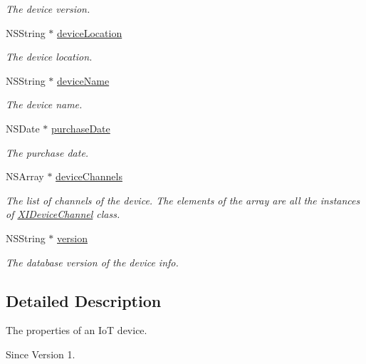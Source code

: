 \begin{DoxyCompactItemize}
\begin{DoxyCompactList}\small\item\em The device version. \end{DoxyCompactList}\item 
N\+S\+String $\ast$ \hyperlink{class_x_i_device_info_a2aa49cfc179f19162a62298f91938ce6}{device\+Location}
\begin{DoxyCompactList}\small\item\em The device location. \end{DoxyCompactList}\item 
N\+S\+String $\ast$ \hyperlink{class_x_i_device_info_ab578d2cea864531a027a611cb30982c1}{device\+Name}
\begin{DoxyCompactList}\small\item\em The device name. \end{DoxyCompactList}\item 
N\+S\+Date $\ast$ \hyperlink{class_x_i_device_info_a764ddcb5a675766b6114c56debe13ac8}{purchase\+Date}
\begin{DoxyCompactList}\small\item\em The purchase date. \end{DoxyCompactList}\item 
N\+S\+Array $\ast$ \hyperlink{class_x_i_device_info_a618f25a4cfac3972fb86c59ada06c662}{device\+Channels}
\begin{DoxyCompactList}\small\item\em The list of channels of the device. The elements of the array are all the instances of \hyperlink{class_x_i_device_channel}{X\+I\+Device\+Channel} class. \end{DoxyCompactList}\item 
N\+S\+String $\ast$ \hyperlink{class_x_i_device_info_aa4b01ce3773d036a1cec1d63381f8d72}{version}
\begin{DoxyCompactList}\small\item\em The database version of the device info. \end{DoxyCompactList}\end{DoxyCompactItemize}


\subsection{Detailed Description}
The properties of an IoT device. 

\begin{DoxySince}{Since}
Version 1. 
\end{DoxySince}


